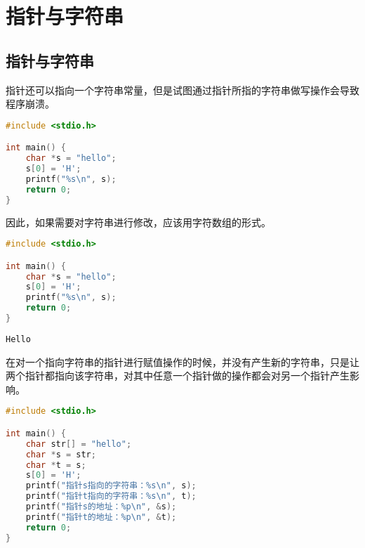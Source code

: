 \newpage

\section{指针与字符串}

\subsection{指针与字符串}

指针还可以指向一个字符串常量，但是试图通过指针所指的字符串做写操作会导致程序崩溃。\\


\begin{lstlisting}[language=C]
#include <stdio.h>

int main() {
    char *s = "hello";
    s[0] = 'H';
    printf("%s\n", s);
    return 0;
}
\end{lstlisting}

因此，如果需要对字符串进行修改，应该用字符数组的形式。\\


\begin{lstlisting}[language=C]
#include <stdio.h>

int main() {
    char *s = "hello";
    s[0] = 'H';
    printf("%s\n", s);
    return 0;
}
\end{lstlisting}

\begin{tcolorbox}
	\begin{verbatim}
Hello
	\end{verbatim}
\end{tcolorbox}

在对一个指向字符串的指针进行赋值操作的时候，并没有产生新的字符串，只是让两个指针都指向该字符串，对其中任意一个指针做的操作都会对另一个指针产生影响。\\


\begin{lstlisting}[language=C]
#include <stdio.h>

int main() {
    char str[] = "hello";
    char *s = str;
    char *t = s;
    s[0] = 'H';
    printf("指针s指向的字符串：%s\n", s);
    printf("指针t指向的字符串：%s\n", t);
    printf("指针s的地址：%p\n", &s);
    printf("指针t的地址：%p\n", &t);
    return 0;
}
\end{lstlisting}

